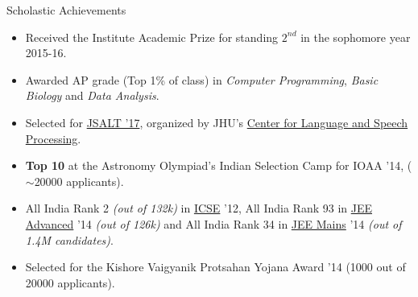 \documentclass{resume} %
\begin{document}
\begin{rSection}{Scholastic Achievements}
\begin{itemize}[leftmargin=*]
\itemsep -0.5em 
\item Received the Institute Academic Prize for standing $2^{nd}$ in the  sophomore year 2015-16.
\item Awarded AP grade (Top 1\% of class) in \textit{Computer Programming}, \textit{Basic Biology} and \textit{Data Analysis}.
\item Selected for \href{https://www.lti.cs.cmu.edu/2017-jsalt-undergraduate}{JSALT '17}, organized by JHU's \href{https://www.clsp.jhu.edu/}{Center for Language and Speech Processing}\footnotemark[2]. 
\item \textbf{Top 10} at the Astronomy Olympiad's Indian Selection Camp for IOAA '14, ($\sim$20000 applicants).
\item All India Rank 2 \textit{(out of 132k)} in \href{https://en.wikipedia.org/wiki/Indian_Certificate_of_Secondary_Education}{ICSE} '12, All India Rank 93 in \href{https://en.wikipedia.org/wiki/Joint_Entrance_Examination}{JEE Advanced} '14 \textit{(out of 126k)} and All India Rank 34 in \href{https://en.wikipedia.org/wiki/Joint_Entrance_Examination}{JEE Mains} '14 \textit{(out of 1.4M candidates)}.
\item Selected for the Kishore Vaigyanik Protsahan Yojana Award '14 (1000 out of 20000 applicants).
\end{itemize}
\end{rSection}
\end{document}
